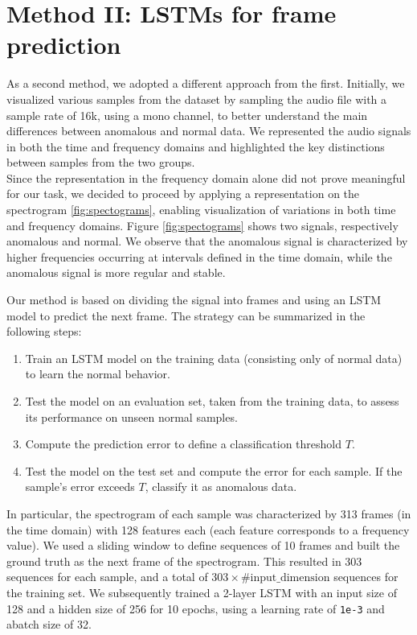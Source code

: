 \documentclass[ngerman]{scrartcl}
\begin{document}
\section{Method II: LSTMs for frame prediction}

As a second method, we adopted a different approach from the first. 
Initially, we visualized various samples from the dataset by sampling the audio file with a sample rate of 16k, using a mono channel, to better understand the main differences between anomalous and normal data. 
We represented the audio signals in both the time and frequency domains and highlighted the key distinctions between samples from the two groups.
\\Since the representation in the frequency domain alone did not prove meaningful for our task, we decided to proceed by applying a representation on the spectrogram \ref{fig:spectograms},
 enabling visualization of variations in both time and frequency domains. Figure \ref{fig:spectograms} shows two signals, respectively anomalous and normal. 
 We observe that the anomalous signal is characterized by higher frequencies occurring at intervals defined in the time domain, while the anomalous signal is more regular and stable.

Our method is based on dividing the signal into frames and using an LSTM model to predict the next frame. The strategy can be summarized in the following steps:
\begin{enumerate}
  \item Train an LSTM model on the training data (consisting only of normal data) to learn the normal behavior.
  \item Test the model on an evaluation set, taken from the training data, to assess its performance on unseen normal samples.
  \item Compute the prediction error to define a classification threshold \( T \).
  \item Test the model on the test set and compute the error for each sample. If the sample’s error exceeds \( T \), classify it as anomalous data.
\end{enumerate}


In particular, the spectrogram of each sample was characterized by 313 frames (in the time domain) with 128 features each (each feature corresponds to a frequency value). 
We used a sliding window to define sequences of 10 frames and built the ground truth as the next frame of the spectrogram. 
This resulted in 303 sequences for each sample, and a total of \(303 \times \text{\#input\_dimension}\) sequences for the training set.
We subsequently trained a 2-layer LSTM with an input size of 128 and a hidden size of 256 for 10 epochs, using a learning rate of \texttt{1e-3} and  abatch size of 32.
\end{document}
